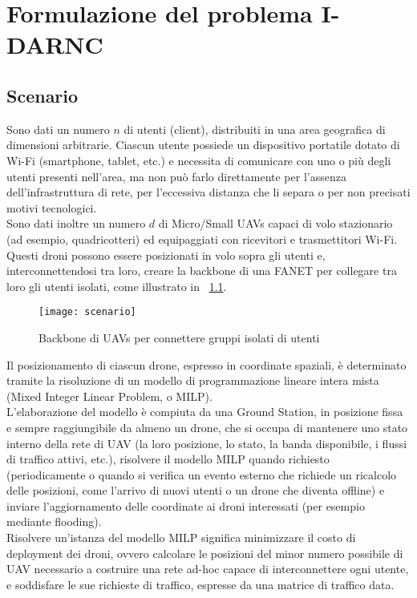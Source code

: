  \chapter{Formulazione del problema I-DARNC} \label{chap:formulazione}

\ifpdf
    \graphicspath{{Chapter3/Figs/Raster/}{Chapter3/Figs/PDF/}{Chapter3/Figs/}}
\else
    \graphicspath{{Chapter3/Figs/Vector/}{Chapter3/Figs/}}
\fi

\section{Scenario}
Sono dati un numero $n$ di utenti (client), distribuiti in una area geografica di dimensioni arbitrarie. 
Ciascun utente possiede un dispositivo portatile dotato di Wi-Fi (smartphone, tablet, etc.) e necessita di comunicare con uno o più degli utenti presenti nell'area, ma non può farlo direttamente per l'assenza dell'infrastruttura di rete, per l'eccessiva distanza che li separa o per non precisati motivi tecnologici. \\
Sono dati inoltre un numero $d$ di Micro/Small UAVs capaci di volo stazionario (ad esempio, quadricotteri) ed equipaggiati con ricevitori e trasmettitori Wi-Fi. 
Questi droni possono essere posizionati in volo sopra gli utenti e, interconnettendosi tra loro, creare la backbone di una FANET per collegare tra loro gli utenti isolati, come illustrato in \figurename\ \ref{fig:scenario}.\\
%
\begin{figure}
	\begin{center}
		\texttt{[image: scenario]}
	\end{center}
	\caption{Backbone di UAVs per connettere gruppi isolati di utenti} \label{fig:scenario}
\end{figure}
%
Il posizionamento di ciascun drone, espresso in coordinate spaziali, è determinato tramite la risoluzione di un modello di programmazione lineare intera mista (Mixed Integer Linear Problem, o MILP). \\
L'elaborazione del modello è compiuta da una Ground Station, in posizione fissa e sempre raggiungibile da almeno un drone, che si occupa di mantenere uno stato interno della rete di UAV (la loro posizione, lo stato, la banda disponibile, i flussi di traffico attivi, etc.), risolvere il modello MILP quando richiesto (periodicamente o quando si verifica un evento esterno che richiede un ricalcolo delle posizioni, come l'arrivo di nuovi utenti o un drone che diventa offline) e inviare l'aggiornamento delle coordinate ai droni interessati (per esempio mediante flooding). \\
Risolvere un'istanza del modello MILP significa minimizzare il costo di deployment dei droni, ovvero calcolare le posizioni del minor numero possibile di UAV necessario a costruire una rete ad-hoc capace di interconnettere ogni utente, e soddisfare le sue richieste di traffico, espresse da una matrice di traffico data. \\

